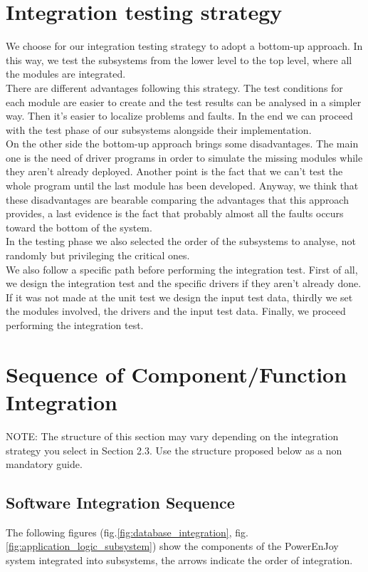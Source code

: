 \section{Integration testing strategy}
We choose for our integration testing strategy to adopt a bottom-up approach. In this way, we test the subsystems from the lower level to the top level, where all the modules are integrated. 
\\There are different advantages following this strategy. The test conditions for each module are easier to create and the test results can be analysed in a simpler way. Then it's easier to localize problems and faults. In the end we can proceed with the test phase of our subsystems alongside their implementation.
\\On the other side the bottom-up approach brings some disadvantages. The main one is the need of driver programs in order to simulate the missing modules while they aren't already deployed. Another point is the fact that we can't test the whole program until the last module has been developed. Anyway, we think that these disadvantages are bearable comparing the advantages that this approach provides, a last evidence is the fact that probably almost all the faults occurs toward the bottom of the system.
\\In the testing phase we also selected the order of the subsystems to analyse, not randomly but privileging the critical ones.
\\ We also follow a specific path before performing the integration test. First of all, we design the integration test and the specific drivers if they aren't already done. If it was not made at the unit test we design the input test data, thirdly we set the modules involved, the drivers and the input test data. Finally, we proceed performing the integration test.

\section{Sequence of Component/Function Integration}
NOTE: The structure of this section may vary depending on the integration strategy you select in Section 2.3. Use the structure proposed below as a non mandatory guide.

	\newpage
	\subsection{Software Integration Sequence}
	The following figures (fig.\ref{fig:database_integration}, fig.\ref{fig:application_logic_subsystem}) show the components of the PowerEnJoy system integrated into subsystems, the arrows indicate the order of integration.

